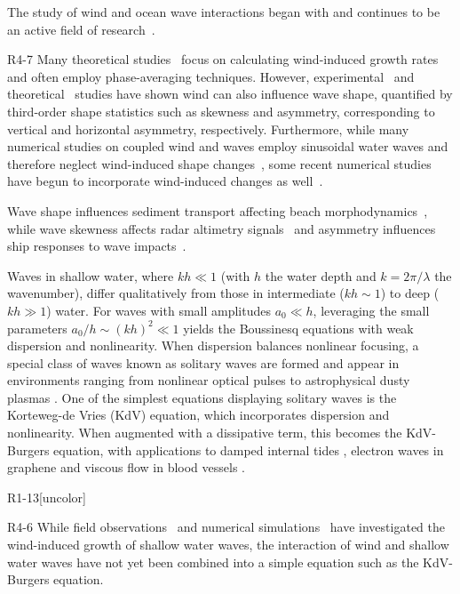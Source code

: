 \documentclass{jfm}
\begin{document}
The study of wind and ocean wave interactions began with
\citet{jeffreys1925formation} and continues to be an active field of
research~\citep[\eg][]{janssen1991quasi,donelan2006wave,sulivan2010dynamics}.
\begin{LineLabel}{R4-7}
Many theoretical
studies~\citep[\eg][]{jeffreys1925formation,miles1957generation,phillips1957generation}
focus on calculating wind-induced growth rates and often employ
phase-averaging techniques.
However,
experimental~\citep[\eg][]{leykin1995asymmetry,feddersen2005wind} and
theoretical~\citep[\eg][]{zdyrski2020wind} studies have shown wind can
also influence wave shape, quantified by third-order shape statistics
such as skewness and asymmetry, corresponding to vertical and horizontal
asymmetry, respectively.
Furthermore, while many numerical studies on coupled wind and waves
employ sinusoidal water waves and therefore neglect wind-induced shape
changes~\citep[\eg][]{hara2015wave,husain2019boundary}, some recent
numerical studies have begun to incorporate wind-induced changes as
well~\citep[\eg][]{liu2010numerical,yang2018direct,hao2019wind}.
\end{LineLabel}
Wave shape influences sediment transport affecting beach
morphodynamics~\citep[\eg][]{drake2001discrete,hoefel2003wave}, while
wave skewness affects radar altimetry
signals~\citep[\eg][]{hayne1980radar} and asymmetry influences ship
responses to wave impacts~\citep[\eg][]{soares2008abnormal}.

Waves in shallow water, where $kh \ll 1$ (with $h$ the water depth and
$k=2\pi/\lambda$ the wavenumber), differ qualitatively from those in
intermediate ($kh \sim 1$) to deep ($kh \gg 1$) water.
For waves with small amplitudes $a_0 \ll h$,
leveraging the small parameters $a_0/h \sim (kh)^2 \ll 1$
yields the Boussinesq equations with weak dispersion and nonlinearity.
When dispersion balances nonlinear
focusing, a special class of waves known as solitary waves are formed
and appear in environments ranging from nonlinear optical pulses
\citep[\eg][]{kivshar1993dark} to astrophysical dusty plasmas
\citep[\eg][]{sahu2012nonextensive}.
One of the simplest equations displaying solitary waves is the
Korteweg-de Vries (KdV) equation, which incorporates dispersion and
nonlinearity.
When augmented with a dissipative term, this becomes the KdV-Burgers
equation, with applications to damped internal tides
\citep[\eg][]{sandstrom1995dissipation}, electron waves in graphene
\citep[\eg][]{zdyrski2019effects} and viscous flow in blood vessels
\citep[\eg][]{antar1999weakly}.
\begin{LineLabel}{R1-13}[uncolor]
\begin{LineLabel}{R4-6}
While field observations~\citep[\eg][]{cavaleri1981wind} and numerical
simulations~\citep[\eg][]{hao2019wind} have investigated the
wind-induced growth of shallow water waves, the interaction of wind and
shallow water waves have not yet been combined into a simple equation
such as the KdV-Burgers equation.
\end{LineLabel}
\end{LineLabel}
\end{document}

